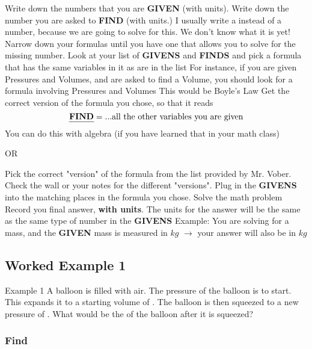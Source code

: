\documentclass[../../main.tex]{subfiles}
\begin{document}
\begin{outline}[enumerate]
	\1 Write down the numbers that you are \textbf{GIVEN} (with units).
	\1 Write down the number you are asked to \textbf{FIND} (with units.)
	\2 I usually write a {\huge\textbf{}} instead of a number, because we are going to solve for this.  We don't know what it is yet!
	\1 Narrow down your formulas until you have one that allows you to solve for the missing number.
	\2 Look at your list of \textbf{GIVENS} and \textbf{FINDS} and pick a formula that has the same variables in it as are in the list
	\3 For instance, if you are given Pressures and Volumes, and are asked to find a Volume, you should look for a formula involving Pressures and Volumes
	\4 This would be Boyle's Law
	\1 Get the correct version of the formula you chose, so that it reads \[\textbf{\emph{FIND}} = ...\text{all the other variables you are given}\]
	\2 You can do this with algebra (if you have learned that in your math class)

	OR

	\2 Pick the correct "version" of the formula from the list provided by Mr. Vober.  Check the wall or your notes for the different "versions".
	\1 Plug in the \textbf{GIVENS} into the matching places in the formula you chose.
	\1 Solve the math problem
	\1 Record you final answer, \textbf{with units}.
	\2 The units for the answer will be the same as the same type of number in the \textbf{GIVENS}
	\2 Example: You are solving for a mass, and the \textbf{GIVEN} mass is measured in $kg$ $\rightarrow$ your answer will also be in $kg$
\end{outline}


\newpage
\subsection{Worked Example 1}

\begin{boxGray}{Example 1}
	A balloon is filled with air.  The pressure of the balloon is  to start.  This expands it to a starting volume of .  The balloon is then squeezed to a new pressure of .  What would be the  of the balloon after it is squeezed?
\end{boxGray}

\subsubsection{Find}
\end{document}
